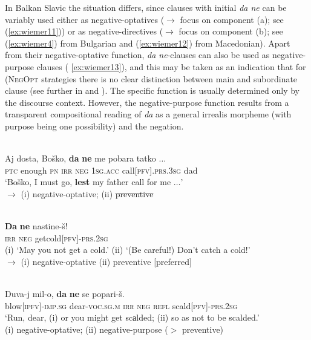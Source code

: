 \documentclass[output=paper,colorlinks,citecolor=brown]{langscibook}
\begin{document}
In Balkan Slavic the situation differs, since clauses with initial \textit{da ne} can be variably used either as negative-optatives (${\rightarrow}$ focus on component (a); see (\ref{ex:wiemer11})) or as negative-directives (${\rightarrow}$ focus on component (b); see (\ref{ex:wiemer4}) from Bulgarian and (\ref{ex:wiemer12}) from Macedonian). Apart from their negative-optative function, \textit{da ne}-clauses can also be used as negative-purpose clauses ( \ref{ex:wiemer13}), and this may be taken as an indication that for (\textsc{NegOpt} strategies there is no clear distinction between main and subordinate clause (see further in  and ). The specific function is usually determined only by the discourse context. However, the negative-purpose function results from a transparent compositional reading of \textit{da} as a general irrealis morpheme (with purpose being one possibility) and the negation.


\ea
\label{ex:wiemer11} 
\\
\gll Aj dosta, Boško, \textbf{da} \textbf{ne} me pobara tatko $\ldots$\\
\textsc{ptc} enough \textsc{pn} \textsc{irr} \textsc{neg} \textsc{1sg.acc} call\textsc{[pfv].prs.3sg} dad \\
\glt `Boško, I must go, \textbf{lest} my father call for me $\ldots$' \\
$\rightarrow$ (i) negative-optative; (ii) \sout{preventive}
\z

\ea
\label{ex:wiemer12} 
 \\
\gll \textbf{Da} \textbf{ne} nastine-š! \\
\textsc{irr} \textsc{neg} get\textunderscore cold\textsc{[pfv]-prs.2sg}\\
\glt (i) `May you not get a cold.' (ii) `(Be careful!) Don't catch a cold!' \\
$\rightarrow$ (i) negative-optative (ii) preventive [preferred]
\z

\ea
\label{ex:wiemer13} 
 \\
\gll Duva-j mil-o, \textbf{da} \textbf{ne} se popari-š. \\
blow\textsc{[ipfv]-imp.sg} dear-\textsc{voc.sg.m} \textsc{irr} \textsc{neg} \textsc{refl} scald\textsc{[pfv]-prs.2sg}\\
\glt `Run, dear, (i) or you might get scаlded; (ii) so as not to be scalded.' \\
(i) negative-optative; (ii) negative-purpose ($>$ preventive) \\
\z
\end{document}
